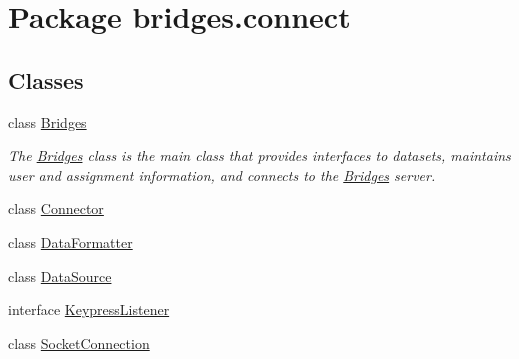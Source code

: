 \hypertarget{namespacebridges_1_1connect}{}\section{Package bridges.\+connect}
\label{namespacebridges_1_1connect}
\subsection*{Classes}
\begin{DoxyCompactItemize}
\item 
class \mbox{\hyperlink{classbridges_1_1connect_1_1_bridges}{Bridges}}
\begin{DoxyCompactList}\small\item\em The \mbox{\hyperlink{classbridges_1_1connect_1_1_bridges}{Bridges}} class is the main class that provides interfaces to datasets, maintains user and assignment information, and connects to the \mbox{\hyperlink{classbridges_1_1connect_1_1_bridges}{Bridges}} server. \end{DoxyCompactList}\item 
class \mbox{\hyperlink{classbridges_1_1connect_1_1_connector}{Connector}}
\item 
class \mbox{\hyperlink{classbridges_1_1connect_1_1_data_formatter}{Data\+Formatter}}
\item 
class \mbox{\hyperlink{classbridges_1_1connect_1_1_data_source}{Data\+Source}}
\item 
interface \mbox{\hyperlink{interfacebridges_1_1connect_1_1_keypress_listener}{Keypress\+Listener}}
\item 
class \mbox{\hyperlink{classbridges_1_1connect_1_1_socket_connection}{Socket\+Connection}}
\end{DoxyCompactItemize}

